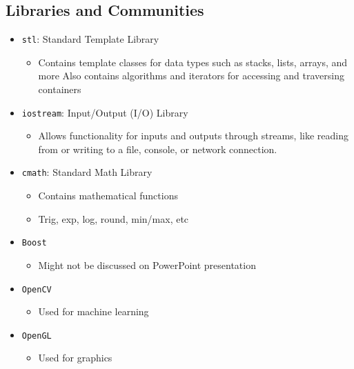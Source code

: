 \subsection{Libraries and Communities}
\begin{itemize}
	\item \texttt{stl}: Standard Template Library
	\begin{itemize}
		\item Contains template classes for data types such as stacks, lists, arrays, and more
		Also contains algorithms and iterators for accessing and traversing containers
	\end{itemize}

	\item  \texttt{iostream}: Input/Output (I/O) Library
	\begin{itemize}
		\item Allows functionality for inputs and outputs through streams, like reading from or writing to a file, console, or network connection.
	\end{itemize}
	
	\item  \texttt{cmath}: Standard Math Library
	\begin{itemize}
		\item Contains mathematical functions
		\item Trig, exp, log, round, min/max, etc
	\end{itemize}
	
	\item  \texttt{Boost} 
	\begin{itemize}
		\item Might not be discussed on PowerPoint presentation
	\end{itemize}

	\item  \texttt{OpenCV}
	\begin{itemize}
		\item Used for machine learning
	\end{itemize}
	
	\item  \texttt{OpenGL}
	\begin{itemize}
		\item Used for graphics
	\end{itemize}
\end{itemize}
